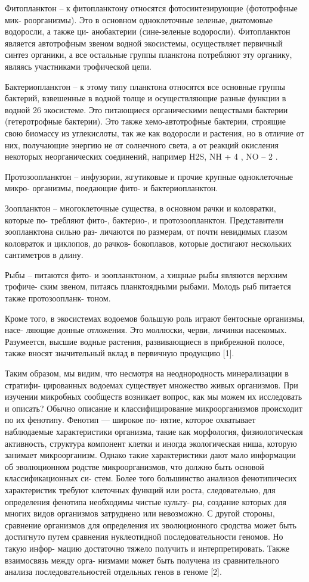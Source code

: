 Фитопланктон – к фитопланктону относятся фотосинтезирующие (фототрофные мик-
роорганизмы). Это в основном одноклеточные зеленые, диатомовые водоросли, а также ци-
анобактерии (сине-зеленые водоросли). Фитопланктон является автотрофным звеном водной
экосистемы, осуществляет первичный синтез органики, а все остальные группы планктона
потребляют эту органику, являясь участниками трофической цепи.

Бактериопланктон – к этому типу планктона относятся все основные группы бактерий,
взвешенные в водной толще и осуществляющие разные функции в водной 26 экосистеме.
Это питающиеся органическими веществами бактерии (гетеротрофные бактерии). Это также
хемо-автотрофные бактерии, строящие свою биомассу из углекислоты, так же как водоросли
и растения, но в отличие от них, получающие энергию не от солнечного света, а от реакций
окисления некоторых неорганических соединений, например H2S, NH +
4
, NO –
2
.

Протозоопланктон – инфузории, жгутиковые и прочие крупные одноклеточные микро-
организмы, поедающие фито- и бактериопланктон.

Зоопланктон – многоклеточные существа, в основном рачки и коловратки, которые по-
требляют фито-, бактерио-, и протозоопланктон. Представители зоопланктона сильно раз-
личаются по размерам, от почти невидимых глазом коловраток и циклопов, до рачков-
бокоплавов, которые достигают нескольких сантиметров в длину.

Рыбы – питаются фито- и зоопланктоном, а хищные рыбы являются верхним трофиче-
ским звеном, питаясь планктоядными рыбами. Молодь рыб питается также протозоопланк-
тоном.

Кроме того, в экосистемах водоемов большую роль играют бентосные организмы, насе-
ляющие донные отложения. Это моллюски, черви, личинки насекомых. Разумеется, высшие
водные растения, развивающиеся в прибрежной полосе, также вносят значительный вклад
в первичную продукцию [1].

Таким образом, мы видим, что несмотря на неоднородность минерализации в стратифи-
цированных водоемах существует множество живых организмов. При изучении микробных
сообществ возникает вопрос, как мы можем их исследовать и описать? Обычно описание и
классифицирование микроорганизмов происходит по их фенотипу. Фенотип — широкое по-
нятие, которое охватывает наблюдаемые характеристики организма, такие как морфология,
физиологическая активность, структура компонент клетки и иногда экологическая ниша,
которую занимает микроорганизм. Однако такие характеристики дают мало информации об
эволюционном родстве микроорганизмов, что должно быть основой классификационных си-
стем. Более того большинство анализов фенотипичесих характеристик требуют клеточных
функций или роста, следовательно, для определения фенотипа необходимы чистые культу-
ры, создание которых для многих видов организмов затруднено или невозможно. С другой
стороны, сравнение организмов для определения их эволюционного сродства может быть
достигнуто путем сравнения нуклеотидной последовательности геномов. Но такую инфор-
мацию достаточно тяжело получить и интерпретировать. Также взаимосвязь между орга-
низмами может быть получена из сравнительного анализа последовательностей отдельных
генов в геноме [2].

